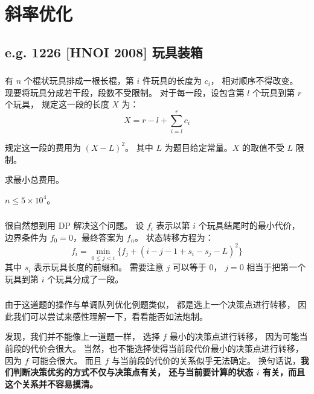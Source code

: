 \documentclass[9pt, UTF8]{beamer} %
\newcommand \fts {\frametitle{\insertsubsection}}
\newcommand \bpause { \bigskip \pause }
\begin{document}
	\section{斜率优化}

	\subsection{e.g. 1226 [HNOI 2008] 玩具装箱}

	\begin{frame}
		\fts

		有 $n$ 个棍状玩具排成一根长棍，第 $i$ 件玩具的长度为 $c_i$，
		相对顺序不得改变。
		现要将玩具分成若干段，段数不受限制。
		对于每一段，设包含第 $l$ 个玩具到第 $r$ 个玩具，
		规定这一段的长度 $X$ 为：
		$$
		X = r - l + \sum_{i = l}^{r} c_i
		$$

		规定这一段的费用为 $(X - L)^2$。
		其中 $L$ 为题目给定常量。$X$ 的取值不受 $L$ 限制。

		求最小总费用。

		\bigskip

		$n \le 5 \times 10^4$。
	\end{frame}

	\begin{frame}
		\fts

		很自然想到用 DP 解决这个问题。
		设 $f_i$ 表示以第 $i$ 个玩具结尾时的最小代价，
		边界条件为 $f_0 = 0$，最终答案为 $f_n$。
		状态转移方程为：
		$$
		f_i = \min_{0 \le j < i} \{ f_j +
		(i - j - 1 + s_i - s_j - L)^2
		\}
		$$
		其中 $s_i$ 表示玩具长度的前缀和。
		需要注意 $j$ 可以等于 $0$，
		$j = 0$ 相当于把第一个玩具到第 $i$ 个玩具分成了一段。
	\end{frame}

	\begin{frame}
		\fts

		由于这道题的操作与单调队列优化例题类似，
		都是选上一个决策点进行转移，
		因此我们可以尝试来感性理解一下，看看能否如法炮制。

		\bpause

		发现，我们并不能像上一道题一样，
		选择 $f$ 最小的决策点进行转移，
		因为可能当前段的代价会很大。
		当然，也不能选择使得当前段代价最小的决策点进行转移，
		因为 $f$ 可能会很大。
		而且 $f$ 与当前段的代价的关系似乎无法确定。
		换句话说，\textbf{我们判断决策优劣的方式不仅与决策点有关，
		还与当前要计算的状态 $i$ 有关，而且这个关系并不容易摸清。}
	\end{frame}
\end{document}
